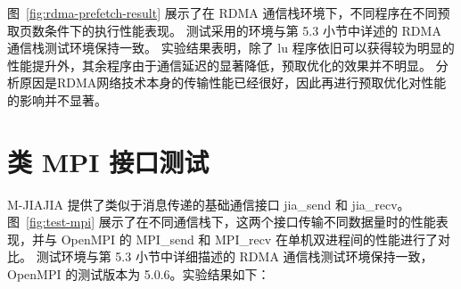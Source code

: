 {    图~\ref{fig:rdma-prefetch-result} 展示了在 RDMA 通信栈环境下，不同程序在不同预取页数条件下的执行性能表现。
    测试采用的环境与第 5.3 小节中详述的 RDMA 通信栈测试环境保持一致。
    实验结果表明，除了 lu 程序依旧可以获得较为明显的性能提升外，其余程序由于通信延迟的显著降低，预取优化的效果并不明显。
    分析原因是RDMA网络技术本身的传输性能已经很好，因此再进行预取优化对性能的影响并不显著。

    \section{类 MPI 接口测试}
    M-JIAJIA 提供了类似于消息传递的基础通信接口 jia\_send 和 jia\_recv。
    图~\ref{fig:test-mpi} 展示了在不同通信栈下，这两个接口传输不同数据量时的性能表现，并与 OpenMPI 的 MPI\_send 和 MPI\_recv 在单机双进程间的性能进行了对比。
    测试环境与第 5.3 小节中详细描述的 RDMA 通信栈测试环境保持一致，OpenMPI 的测试版本为 5.0.6。实验结果如下：

}
